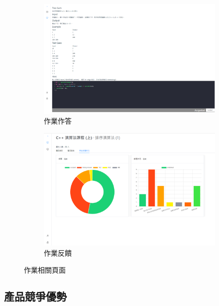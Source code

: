 \begin{figure}[H]
  \begin{subfigure}{0.5\linewidth}
    \centering
    \includegraphics[width=1\textwidth]{images/homework.png}
    \caption{作業作答}
  \end{subfigure}
  \begin{subfigure}{0.5\linewidth}
    \centering
    \includegraphics[width=1\textwidth]{images/feedback.png}
    \caption{作業反饋}
  \end{subfigure}
  \caption{作業相關頁面}
  \label{fig:homework}
\end{figure}


\subsection{產品競爭優勢}

